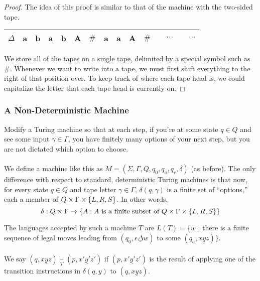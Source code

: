 \documentclass[]{article}
\DeclarePairedDelimiter{\set}{\lbrace}{\rbrace}
\theoremstyle{definition}
\begin{document}
        \begin{proof}
          The idea of this proof is similar to that of the machine with the two-sided tape.
          \begin{center}
          \begin{tabular}{|c|c|c|c|c|c|c|c|c|c|c|cccc}
            \hline
            $\Delta$ & a & b & a & b & A & $\#$ & a & a & A & $\#$ & & $\cdots$ & & $\cdots$ \\
            \hline
          \end{tabular}
        \end{center}

        We store all of the tapes on a single tape, delimited by a special symbol such as $\#$. Whenever we want to write into a tape, we must first shift everything to the right of that position over. To keep track of where each tape head is, we could capitalize the letter that each tape head is currently on.
        \end{proof}

      \subsubsection{A Non-Deterministic Machine}
        Modify a Turing machine so that at each step, if you're at some state $q \in Q$ and see some input $\gamma \in \Gamma$, you have finitely many options of your next step, but you are not dictated which option to choose.
        \\ \\
        We define a machine like this as $M = (\Sigma, \Gamma, Q, q_0, q_a, q_r, \delta)$ (as before). The only difference with respect to standard, deterministic Turing machines is that now, for every state $q \in Q$ and tape letter $\gamma \in \Gamma$, $\delta(q, \gamma)$ is a finite set of ``options,'' each a member of $Q \times \Gamma \times \set{L, R, S}$. In other words,
        $$
          \delta: Q \times \Gamma \to \set{A : A \text{ is a finite subset of } Q \times \Gamma \times \set{L, R, S}}
        $$

        The languages accepted by such a machine $T$ are $L(T) = $\{$w$ : there is a finite sequence of legal moves leading from $(q_0, \epsilon \underline{\Delta} w)$ to some $(q_a, x \underline{y}z)\}$.
        \\ \\
        We say $(q, x \underline{y}z) \underset{T}{\vdash} (p, x'\underline{y'}z')$ if $(p, x'\underline{y'}z')$ is the result of applying one of the transition instructions in $\delta(q, y)$ to $(q, x\underline{y}z)$.
\end{document}
